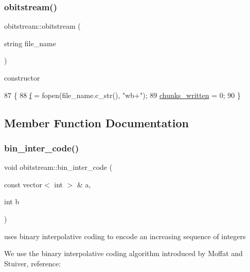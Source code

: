 \subsubsection{\texorpdfstring{obitstream()}{obitstream()}}
{\footnotesize\ttfamily obitstream\+::obitstream (\begin{DoxyParamCaption}\item[{string}]{file\+\_\+name }\end{DoxyParamCaption})\hspace{0.3cm}{\ttfamily [inline]}}



constructor 


\begin{DoxyCode}
87                               \{
88     \hyperlink{classobitstream_ac589d74745217748c888ae777ab324a7}{f} = fopen(file\_name.c\_str(), \textcolor{stringliteral}{"wb+"});
89     \hyperlink{classobitstream_a3022397f2b6133ea5990016d9d078a2f}{chunks\_written} = 0;
90   \}
\end{DoxyCode}


\subsection{Member Function Documentation}
\mbox{\label{classobitstream_a945c237be04936240953ba927486cde1}} 
\subsubsection{\texorpdfstring{bin\+\_\+inter\+\_\+code()}{bin\_inter\_code()}\hspace{0.1cm}{\footnotesize\ttfamily [1/2]}}
{\footnotesize\ttfamily void obitstream\+::bin\+\_\+inter\+\_\+code (\begin{DoxyParamCaption}\item[{const vector$<$ int $>$ \&}]{a,  }\item[{int}]{b }\end{DoxyParamCaption})}



uses binary interpolative coding to encode an increasing sequence of integers 

We use the binary interpolative coding algorithm introduced by Moffat and Stuiver, reference\+:

